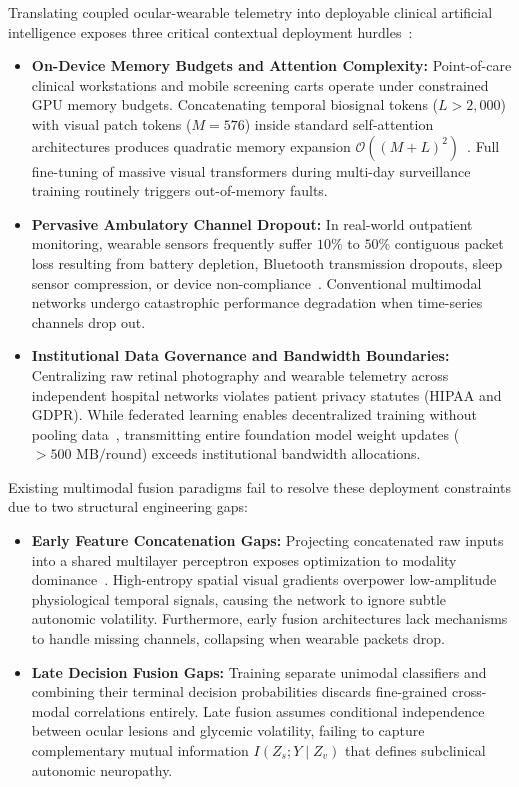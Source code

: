\documentclass[a4paper,fleqn]{cas-dc}
\begin{document}
Translating coupled ocular-wearable telemetry into deployable clinical artificial intelligence exposes three critical contextual deployment hurdles~\cite{baltrusaitis2018multimodal,ma2023multimodal}:
\begin{itemize}
    \item \textbf{On-Device Memory Budgets and Attention Complexity:} Point-of-care clinical workstations and mobile screening carts operate under constrained GPU memory budgets. Concatenating temporal biosignal tokens ($L > 2{,}000$) with visual patch tokens ($M=576$) inside standard self-attention architectures produces quadratic memory expansion $\mathcal{O}((M + L)^2)$~\cite{vaswani2017attention}. Full fine-tuning of massive visual transformers during multi-day surveillance training routinely triggers out-of-memory faults.
    \item \textbf{Pervasive Ambulatory Channel Dropout:} In real-world outpatient monitoring, wearable sensors frequently suffer $10\%$ to $50\%$ contiguous packet loss resulting from battery depletion, Bluetooth transmission dropouts, sleep sensor compression, or device non-compliance~\cite{ma2023multimodal}. Conventional multimodal networks undergo catastrophic performance degradation when time-series channels drop out.
    \item \textbf{Institutional Data Governance and Bandwidth Boundaries:} Centralizing raw retinal photography and wearable telemetry across independent hospital networks violates patient privacy statutes (HIPAA and GDPR). While federated learning enables decentralized training without pooling data~\cite{mcmahan2017communication,rieke2020future,sajjadi2024speed}, transmitting entire foundation model weight updates ($>500\text{ MB/round}$) exceeds institutional bandwidth allocations.
\end{itemize}

Existing multimodal fusion paradigms fail to resolve these deployment constraints due to two structural engineering gaps:
\begin{itemize}
    \item \textbf{Early Feature Concatenation Gaps:} Projecting concatenated raw inputs into a shared multilayer perceptron exposes optimization to modality dominance~\cite{nagrani2021attention,ma2023multimodal}. High-entropy spatial visual gradients overpower low-amplitude physiological temporal signals, causing the network to ignore subtle autonomic volatility. Furthermore, early fusion architectures lack mechanisms to handle missing channels, collapsing when wearable packets drop.
    \item \textbf{Late Decision Fusion Gaps:} Training separate unimodal classifiers and combining their terminal decision probabilities discards fine-grained cross-modal correlations entirely. Late fusion assumes conditional independence between ocular lesions and glycemic volatility, failing to capture complementary mutual information $I(Z_s; Y \mid Z_v)$ that defines subclinical autonomic neuropathy.
\end{itemize}
\end{document}
